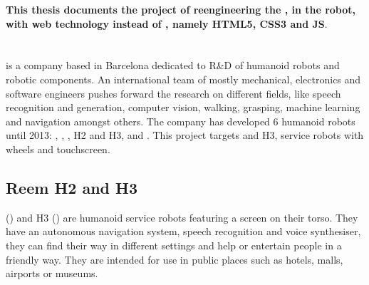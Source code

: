 \textbf{This thesis documents the project of reengineering the \cm , in the robot, with web technology instead of \flash , namely \acs{HTML5}, \acs{CSS3} and \acf{JS}}.

\section{\company}
\company is a company based in Barcelona dedicated to R\&D of humanoid robots and robotic components. 
An international team of mostly mechanical, electronics and software engineers pushes forward the research on different fields, like speech recognition and generation, computer vision, walking, grasping, machine learning and navigation amongst others.
The company has developed 6 humanoid robots until 2013: , , , H2 and H3, and .
This project targets  and H3, service robots with wheels and touchscreen.

\subsection*{Reem H2 and H3}
 () and H3 () are humanoid service robots featuring a screen on their torso.
They have an autonomous navigation system, speech recognition and voice synthesiser, they can find their way in different settings and help or entertain people in a friendly way.
They are intended for use in public places such as hotels, malls, airports or museums.

